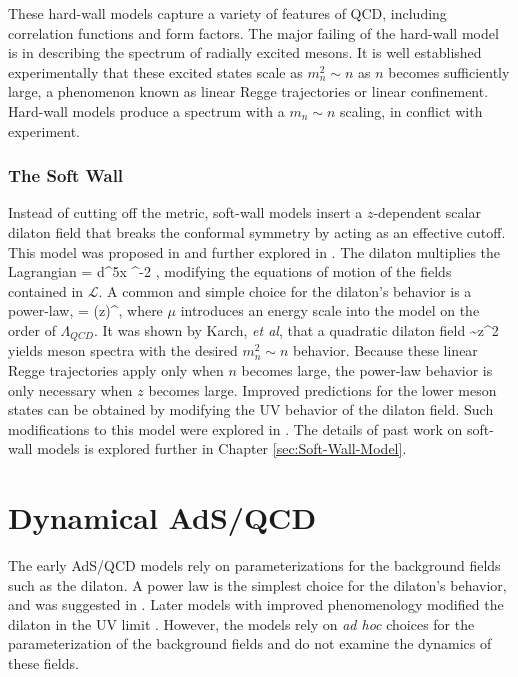 These hard-wall models capture a variety of features of QCD, including correlation functions and form factors.
The major failing of the hard-wall model is in describing the spectrum of radially excited mesons.
It is well established experimentally that these excited states scale as $m_n^2 \sim n$ as $n$ becomes sufficiently large, a phenomenon known as linear Regge trajectories or linear confinement.
Hard-wall models produce a spectrum with a $m_n \sim n$ scaling, in conflict with experiment.

\subsubsection{The Soft Wall}
Instead of cutting off the metric, soft-wall models insert a $z$-dependent scalar dilaton field that breaks the conformal symmetry by acting as an effective cutoff.
This model was proposed in \cite{karch-katz-son-adsqcd} and further explored in \cite{Evans:2006ea,Grigoryan:2007my,kwee-lebed-pion,Cherman2009,colangelo2008,Huang:2007fv}. 
The dilaton multiplies the Lagrangian
\be
{} = \int d^5x ^{-2\Phi} \root  {},
\ee
modifying the equations of motion of the fields contained in $\mathcal{L}$. 
A common and simple choice for the dilaton's behavior is a power-law,
\be
\Phi = (\mu z)^\nu,
\ee
where $\mu$ introduces an energy scale into the model on the order of $\Lambda_{QCD}$.
It was shown by Karch, \emph{et al}, \cite{karch-katz-son-adsqcd} that a quadratic dilaton field
\be
\Phi \sim z^2
\ee
yields meson spectra with the desired $m_n^2 \sim n$ behavior.
Because these linear Regge trajectories apply only when $n$ becomes large, the power-law behavior is only necessary when $z$ becomes large.
Improved predictions for the lower meson states can be obtained by modifying the UV behavior of the dilaton field.
Such modifications to this model were explored in \cite{gherghetta-kelley}.
The details of past work on soft-wall models is explored further in Chapter \ref{sec:Soft-Wall-Model}.

\section{Dynamical AdS/QCD}
The early AdS/QCD models rely on parameterizations for the background fields such as the dilaton.
A power law is the simplest choice for the dilaton's behavior, and was suggested in \cite{karch-katz-son-adsqcd}.
Later models with improved phenomenology modified the dilaton in the UV limit \cite{gherghetta-kelley}.
However, the models rely on \emph{ad hoc} choices for the parameterization of the background fields and do not examine the dynamics of these fields.

